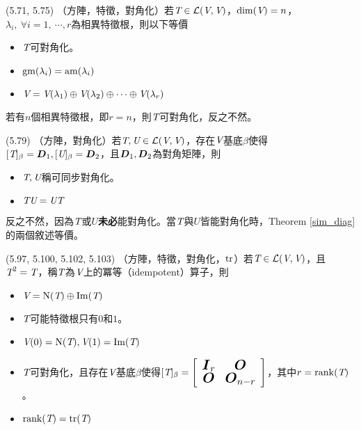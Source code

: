\item \begin{theorem}{(5.71, 5.75)} （方陣，特徵，對角化）若$\textit{T} \in \mathcal{L}(\textit{V}, \textit{V})$，$\dim(\textit{V}) = n$，$\lambda_i, \ \forall i = 1, \ \cdots, r$為相異特徵根，則以下等價
	\begin{itemize}
		\item $\textit{T}$可對角化。
		\item $\operatorname{gm}(\lambda_i) = \operatorname{am}(\lambda_i)$
		\item $\textit{V} = \textit{V}(\lambda_1) \oplus \textit{V}(\lambda_2) \oplus \cdots \oplus \textit{V}(\lambda_r)$
	\end{itemize}
	若有$n$個相異特徵根，即$r = n$，則$\textit{T}$可對角化，反之不然。
\end{theorem}

\item \begin{theorem}{(5.79)} （方陣，對角化）若$\textit{T}, \textit{U} \in \mathcal{L}(\textit{V}, \textit{V})$，存在$\textit{V}$基底$\beta$使得$[\textit{T}]_{\beta} = \boldsymbol{D}_1, [\textit{U}]_{\beta} = \boldsymbol{D}_2$，且$\boldsymbol{D}_1, \boldsymbol{D}_2$為對角矩陣，則
	\begin{itemize}
		\item $\textit{T}, \textit{U}$稱可同步對角化。\label{sim_diag}
		\item $\textit{T}\textit{U} = \textit{U}\textit{T}$
	\end{itemize}
	反之不然，因為$\textit{T}$或$\textit{U}$\textbf{未必}能對角化。當$\textit{T}$與$\textit{U}$皆能對角化時，Theorem \ref{sim_diag}的兩個敘述等價。
\end{theorem}

\item \begin{theorem}{(5.97, 5.100, 5.102, 5.103)} （方陣，特徵，對角化，$\operatorname{tr}$）若$\textit{T} \in \mathcal{L}(\textit{V}, \textit{V})$，且$\textit{T}^2 = \textit{T}$，稱$\textit{T}$為$\textit{V}$上的冪等（idempotent）算子，則
	\begin{itemize}
		\item $\textit{V} = \operatorname{N}(\textit{T}) \oplus \operatorname{Im}(\textit{T})$
		\item $\textit{T}$可能特徵根只有$0$和$1$。
		\item $\textit{V}(0) = \operatorname{N}(\textit{T}), \textit{V}(1) = \operatorname{Im}(\textit{T})$
		\item $\textit{T}$可對角化，且存在$\textit{V}$基底$\beta$使得$[\textit{T}]_{\beta} = 
		{\left[ 
		\begin{array}{cc}
			\Large{\boldsymbol{I}_r} & \Large{\boldsymbol{O}} \\
			\Large{\boldsymbol{O}} & \Large{\boldsymbol{O}_{n - r}}
		\end{array} 
		\right]}$，其中$r = \operatorname{rank}(\textit{T})$。
		\item $\operatorname{rank}(\textit{T}) = \operatorname{tr}(\textit{T})$
	\end{itemize}
\end{theorem}

